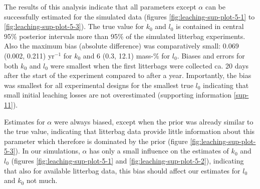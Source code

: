 \documentclass[
  12pt,
]{article}
\begin{document}
The results of this analysis indicate that all parameters except \(\alpha\) can be successfully estimated for the simulated data (figures \ref{fig:leaching-sup-plot-5-1} to \ref{fig:leaching-sup-plot-5-3}). The true value for \(k_0\) and \(l_0\) is contained in central 95\% posterior intervals more than 95\% of the simulated litterbag experiments. Also the maximum bias (absolute difference) was comparatively small: 0.069 (0.002, 0.211) yr\(^{-1}\) for \(k_0\) and 6 (0.3, 12.1) mass-\% for \(l_0\). Biases and errors for both \(k_0\) and \(l_0\) were smallest when the first litterbags were collected ca. 20 days after the start of the experiment compared to after a year. Importantly, the bias was smallest for all experimental designs for the smallest true \(l_0\) indicating that small initial leaching losses are not overestimated (supporting information \ref{sup-11}).

Estimates for \(\alpha\) were always biased, except when the prior was already similar to the true value, indicating that litterbag data provide little information about this parameter which therefore is dominated by the prior (figure \ref{fig:leaching-sup-plot-5-3}). In our simulations, \(\alpha\) has only a small influence on the estimates of \(k_0\) and \(l_0\) (figures \ref{fig:leaching-sup-plot-5-1} and \ref{fig:leaching-sup-plot-5-2}), indicating that also for available litterbag data, this bias should affect our estimates for \(l_0\) and \(k_0\) not much.
\end{document}
